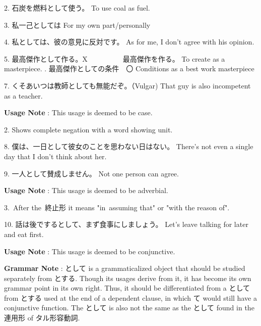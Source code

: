 \par{2. 石炭を燃料として使う。 \hfill\break
To use coal as fuel. }

\par{3. 私一己としては \hfill\break
For my own part\slash personally }

\par{4. 私としては、彼の意見に反対です。 \hfill\break
As for me, I don't agree with his opinion. }

\par{5. 最高傑作として作る。X　　　\textrightarrow 　　最高傑作を作る。 \hfill\break
To create as a masterpiece. \hfill\break
\hfill{}. 最高傑作としての条件　〇 \hfill\break
Conditions as a best work masterpiece }

\par{7. くそあいつは教師としても無能だぞ。（Vulgar) \hfill\break
That guy is also incompetent as a teacher. }

\par{\textbf{Usage Note }: This usage is deemed to be case. }

\par{2. Shows complete negation with a word showing unit. }

\par{8. 僕は、一日として彼女のことを思わない日はない。 \hfill\break
There's not even a single day that I don't think about her. }

\par{9. 一人として賛成しません。 \hfill\break
Not one person can agree. }

\par{\textbf{Usage Note }: This usage is deemed to be adverbial. }

\par{3. After the 終止形 it means "in assuming that" or "with the reason of". }

\par{10. 話は後でするとして、まず食事にしましょう。 \hfill\break
Let's leave talking for later and eat first. }

\par{\textbf{Usage Note }: This usage is deemed to be conjunctive. }

\par{\textbf{Grammar Note }: として is a grammaticalized object that should be studied separately from とする. Though its usages derive from it, it has become its own grammar point in its own right. Thus, it should be differentiated from a として from とする used at the end of a dependent clause, in which て would still have a conjunctive function. The として is also not the same as the として found in the 連用形 of タル形容動詞. }

